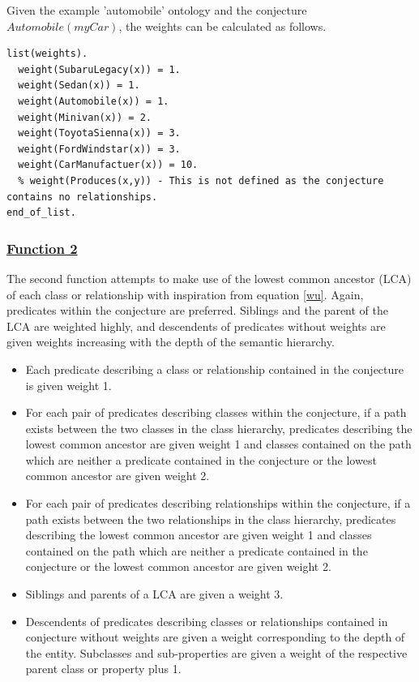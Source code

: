 \documentclass{article}
\begin{document}
Given the example 'automobile' ontology and the conjecture $Automobile(myCar)$, the weights can be calculated as follows. 

\begin{singlespace}
\begin{verbatim}
list(weights).
  weight(SubaruLegacy(x)) = 1. 
  weight(Sedan(x)) = 1. 
  weight(Automobile(x)) = 1. 
  weight(Minivan(x)) = 2. 
  weight(ToyotaSienna(x)) = 3. 
  weight(FordWindstar(x)) = 3. 
  weight(CarManufactuer(x)) = 10. 
  % weight(Produces(x,y)) - This is not defined as the conjecture contains no relationships. 
end_of_list.
\end{verbatim}
\end{singlespace}

\subsubsection{\underline{Function 2}}

The second function attempts to make use of the lowest common ancestor (LCA) of each class or relationship with inspiration from equation \ref{wu}. Again, predicates within the conjecture are preferred. Siblings and the parent of the LCA are weighted highly, and descendents of predicates without weights are given weights increasing with the depth of the semantic hierarchy. 

\begin{singlespace}
\begin{itemize}
	\item Each predicate describing a class or relationship contained in the conjecture is given weight 1. 
	\item For each pair of predicates describing classes within the conjecture, if a path exists between the two classes in the class hierarchy, predicates describing the lowest common ancestor are given weight 1 and classes contained on the path which are neither a predicate contained in the conjecture or the lowest common ancestor are given weight 2. 
	\item For each pair of predicates describing relationships within the conjecture, if a path exists between the two relationships in the class hierarchy, predicates describing the lowest common ancestor are given weight 1 and classes contained on the path which are neither a predicate contained in the conjecture or the lowest common ancestor are given weight 2. 
	\item Siblings and parents of a LCA are given a weight 3. 
	\item Descendents of predicates describing classes or relationships contained in conjecture without weights are given a weight corresponding to the depth of the entity. Subclasses and sub-properties are given a weight of the respective parent class or property plus 1. 
\end{itemize}
\end{singlespace}
\end{document}

